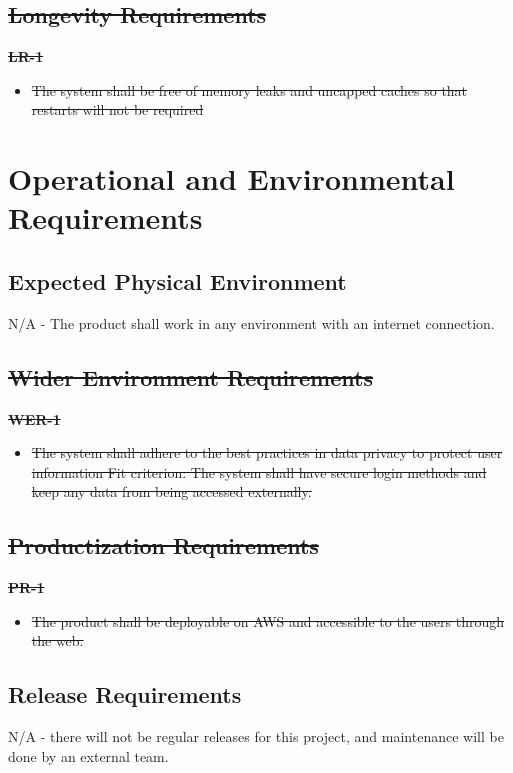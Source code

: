 \documentclass[12pt]{article}
\begin{document}
\subsection{\sout{Longevity Requirements}}
\textbf{\sout{LR-1}}
\begin{itemize}
    \item \sout{The system shall be free of memory leaks and uncapped caches so that restarts will not be required}
\end{itemize}

\section{Operational and Environmental Requirements}
\subsection{Expected Physical Environment}
N/A - The product shall work in any environment with an internet connection.

\subsection{\sout{Wider Environment Requirements}}

\textbf{\sout{WER-1}}
\begin{itemize}
    \item \sout{The system shall adhere to the best practices in data privacy to protect user information \hfill \break
    Fit criterion: The system shall have secure login methods and keep any data from being accessed externally.}
\end{itemize}

\subsection{\sout{Productization Requirements}}
\textbf{\sout{PR-1}}
\begin{itemize}
    \item \sout{The product shall be deployable on AWS and accessible to the users through the web.}
\end{itemize}

\subsection{Release Requirements}
N/A - there will not be regular releases for this project, and maintenance will be done by an external team.
\end{document}
